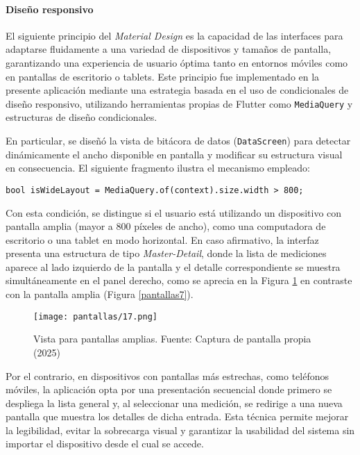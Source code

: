 \paragraph{Diseño responsivo}

El siguiente principio del \textit{Material Design} es la capacidad de las interfaces para adaptarse fluidamente a una variedad de dispositivos y tamaños de pantalla, garantizando una experiencia de usuario óptima tanto en entornos móviles como en pantallas de escritorio o tablets. Este principio fue implementado en la presente aplicación mediante una estrategia basada en el uso de condicionales de diseño responsivo, utilizando herramientas propias de Flutter como \texttt{MediaQuery} y estructuras de diseño condicionales.

En particular, se diseñó la vista de bitácora de datos (\texttt{DataScreen}) para detectar dinámicamente el ancho disponible en pantalla y modificar su estructura visual en consecuencia. El siguiente fragmento ilustra el mecanismo empleado:

\begin{verbatim}
bool isWideLayout = MediaQuery.of(context).size.width > 800;
\end{verbatim}

Con esta condición, se distingue si el usuario está utilizando un dispositivo con pantalla amplia (mayor a 800 píxeles de ancho), como una computadora de escritorio o una tablet en modo horizontal. En caso afirmativo, la interfaz presenta una estructura de tipo \textit{Master-Detail}, donde la lista de mediciones aparece al lado izquierdo de la pantalla y el detalle correspondiente se muestra simultáneamente en el panel derecho, como se aprecia en la Figura \ref{pantallas17} en contraste con la pantalla amplia (Figura \ref{pantallas7}).

\begin{figure}[h!]
    \centering
    \texttt{[image: pantallas/17.png]}
    \caption{Vista para pantallas amplias. Fuente: Captura de pantalla propia (2025)}
    \label{pantallas17}
\end{figure}

Por el contrario, en dispositivos con pantallas más estrechas, como teléfonos móviles, la aplicación opta por una presentación secuencial donde primero se despliega la lista general y, al seleccionar una medición, se redirige a una nueva pantalla que muestra los detalles de dicha entrada. Esta técnica permite mejorar la legibilidad, evitar la sobrecarga visual y garantizar la usabilidad del sistema sin importar el dispositivo desde el cual se accede.

